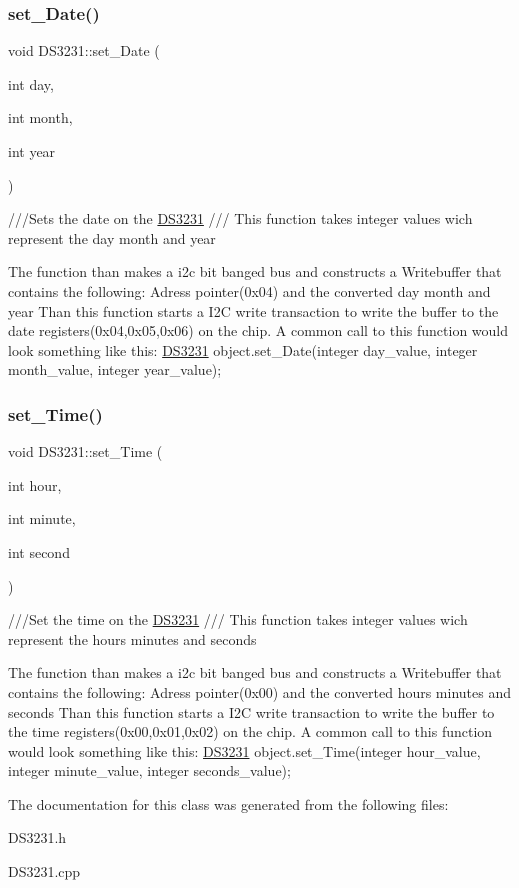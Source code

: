 \subsubsection{\texorpdfstring{set\+\_\+\+Date()}{set\_Date()}}
{\footnotesize\ttfamily void D\+S3231\+::set\+\_\+\+Date (\begin{DoxyParamCaption}\item[{int}]{day,  }\item[{int}]{month,  }\item[{int}]{year }\end{DoxyParamCaption})}



///\+Sets the date on the \hyperlink{classDS3231}{D\+S3231}  /// This function takes integer values wich represent the day month and year 

The function than makes a i2c bit banged bus and constructs a Writebuffer that contains the following\+: Adress pointer(0x04) and the converted day month and year Than this function starts a I2C write transaction to write the buffer to the date registers(0x04,0x05,0x06) on the chip. A common call to this function would look something like this\+: \hyperlink{classDS3231}{D\+S3231} object.\+set\+\_\+\+Date(integer day\+\_\+value, integer month\+\_\+value, integer year\+\_\+value); \mbox{\label{classDS3231_aee414e3f1856b9495a79e659b92231c1}} 
\subsubsection{\texorpdfstring{set\+\_\+\+Time()}{set\_Time()}}
{\footnotesize\ttfamily void D\+S3231\+::set\+\_\+\+Time (\begin{DoxyParamCaption}\item[{int}]{hour,  }\item[{int}]{minute,  }\item[{int}]{second }\end{DoxyParamCaption})}



///\+Set the time on the \hyperlink{classDS3231}{D\+S3231}  /// This function takes integer values wich represent the hours minutes and seconds 

The function than makes a i2c bit banged bus and constructs a Writebuffer that contains the following\+: Adress pointer(0x00) and the converted hours minutes and seconds Than this function starts a I2C write transaction to write the buffer to the time registers(0x00,0x01,0x02) on the chip. A common call to this function would look something like this\+: \hyperlink{classDS3231}{D\+S3231} object.\+set\+\_\+\+Time(integer hour\+\_\+value, integer minute\+\_\+value, integer seconds\+\_\+value); 

The documentation for this class was generated from the following files\+:\begin{DoxyCompactItemize}
\item 
D\+S3231.\+h\item 
D\+S3231.\+cpp\end{DoxyCompactItemize}
